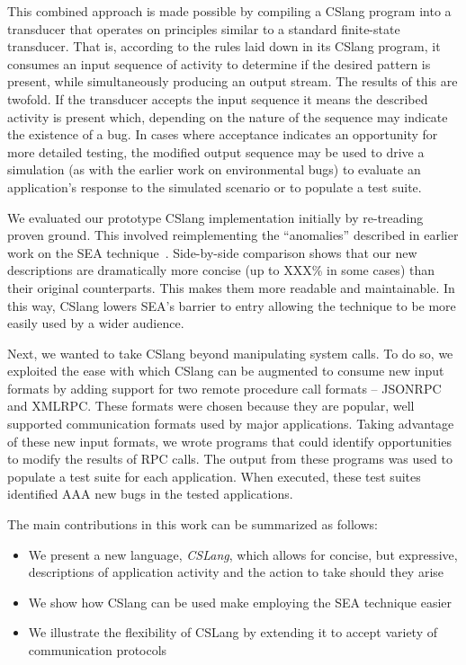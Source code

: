 This combined approach is made possible
by compiling a CSlang program
into a transducer
that operates on principles similar
to a standard finite-state transducer.
That is,
according to the rules laid down in its CSlang program,
it consumes an input sequence of activity
to determine if the desired pattern is present,
while simultaneously producing an output stream.
The results of this are twofold.
If the transducer accepts the input sequence
it means the described activity is present which,
depending on the nature of the sequence
may indicate the existence of a bug.
In cases where acceptance indicates an opportunity
for more detailed testing,
the modified output sequence may be used
to drive a simulation (as with the earlier work on environmental bugs)
to evaluate an application's response to the simulated scenario
or to populate a test suite.

We evaluated our prototype CSlang
implementation initially by 
re-treading proven ground.
This involved reimplementing the ``anomalies''  
described in earlier work on the SEA technique~\cite{crashsim}.
Side-by-side comparison shows that our new
descriptions are dramatically more concise (up to XXX\% in some cases)
than their original counterparts.
This makes them
more readable
and maintainable.
In this way, CSlang lowers SEA's barrier to entry
allowing the technique to be more easily used by a wider audience.

Next, we wanted to take CSlang beyond manipulating system calls.
To do so, 
we exploited the ease with which
CSlang can be augmented
to consume new input formats
by adding support for two remote procedure call formats -- JSONRPC and XMLRPC.
These formats were chosen
because they are popular,
well supported communication formats
used by major applications.
Taking advantage of these new input formats,
we wrote programs
that could identify opportunities
to modify the results of RPC calls.
The output from these programs was used to populate a test suite
for each application.
When executed, these test suites identified AAA new bugs in the tested applications.

The main contributions in this work can be summarized as follows:

\begin{itemize}

\item{We present a new language, {\em CSLang},
  which allows for concise, but expressive, descriptions of
    application activity and the action to take should they arise}

\item{We show how CSlang can be used make employing the SEA technique easier}

\item{We illustrate the flexibility of CSLang by extending it to accept variety of communication protocols}

\end{itemize}

